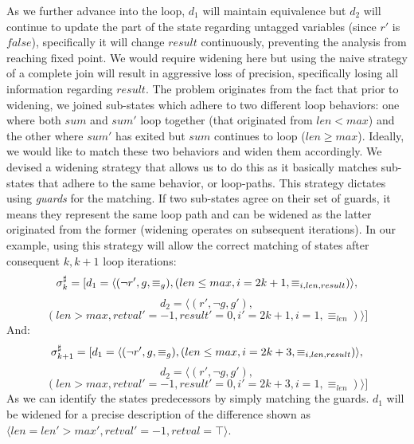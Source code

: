 As we further advance into the loop, $d_1$ will maintain equivalence but $d_2$ will continue to update the part of the state regarding untagged variables  (since $r'$ is $false$), specifically it will change $result$ continuously, preventing the analysis from reaching fixed point. We would require widening here but using the naive strategy of a complete join will result in aggressive loss of precision, specifically losing all information regarding $result$. The problem originates from the fact that prior to widening, we joined sub-states which adhere to two different loop behaviors: one where both $sum$ and $sum'$ loop together (that originated from $len < max$) and the other where $sum'$ has exited but $sum$ continues to loop ($len \geq max$). Ideally, we would like to match these two behaviors and widen them accordingly. We devised a widening strategy that allows us to do this as it basically matches sub-states that adhere to the same behavior, or loop-paths. This strategy dictates using \emph{guards} for the matching. If two sub-states agree on their set of guards, it means they represent the same loop path and can be widened as the latter originated from the former (widening operates on subsequent iterations). In our example, using this strategy will allow the correct matching of states after consequent $k, k+1$ loop iterations:
{\footnotesize
\[
\sigma^\sharp_{k} = [ d_1 = \langle (\neg r',g,\equiv_{g}),(len \leq max, i = 2k + 1, \equiv_{i,len,result}) \rangle,
\]
\[
d_2 = \langle (r',\neg g,g'),
\]
\[
(len > max, retval' = -1, result' = 0, i' = 2k + 1, i = 1, \equiv_{len}) \rangle ]
\]
}
{\footnotesize
And:
\[
\sigma^\sharp_{k+1} = [ d_1 = \langle (\neg r',g,\equiv_{g}),(len \leq max, i = 2k + 3, \equiv_{i,len,result}) \rangle,
\]
\[
d_2 = \langle (r',\neg g,g'),
\]
\[
(len > max, retval' = -1, result' = 0, i' = 2k + 3, i = 1, \equiv_{len}) \rangle ]
\]
}
As we can identify the states predecessors by simply matching the guards. $d_1$ will be widened for a precise description of the difference shown as $\langle len = len' > max', retval' = -1, retval = \top \rangle$.

